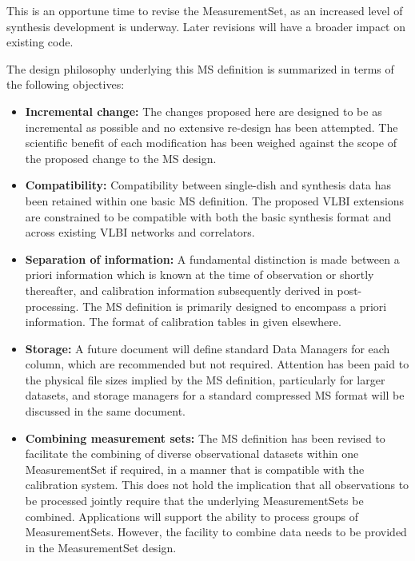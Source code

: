 \documentclass{article}
\begin{document}
This is an opportune time to revise the MeasurementSet, as an
increased level of synthesis development is underway. Later revisions
will have a broader impact on existing code.

The design philosophy underlying this MS definition is summarized in
terms of the following objectives:

\begin{itemize}

\item{{\bf Incremental change:} The changes proposed here are designed
to be as incremental as possible and no extensive re-design has been
attempted. The scientific benefit of each modification has been weighed
against the scope of the proposed change to the MS design.}

\item{{\bf Compatibility:} Compatibility between single-dish and
synthesis data has been retained within one basic MS definition. The
proposed VLBI extensions are constrained to be compatible with both
the basic synthesis format and across existing VLBI networks and
correlators.}

\item{{\bf Separation of information:} A fundamental distinction is
made between a priori information which is known at the time of
observation or shortly thereafter, and calibration information
subsequently derived in post-processing. The MS definition is
primarily designed to encompass a priori information. The format of
calibration tables in given elsewhere.}

\item{{\bf Storage:} A future document will define standard Data
Managers for each column, which are recommended but not
required. Attention has been paid to the physical file sizes implied
by the MS definition, particularly for larger datasets, and storage
managers for a standard compressed MS format will be discussed in the
same document.}

\item{{\bf Combining measurement sets:} The MS definition has been
revised to facilitate the combining of diverse observational datasets
within one MeasurementSet if required, in a manner that is compatible
with the calibration system. This does not hold the implication that
all observations to be processed jointly require that the underlying
MeasurementSets be combined. Applications will support the ability to
process groups of MeasurementSets. However, the facility to combine
data needs to be provided in the MeasurementSet design.

}
\end{itemize}
\end{document}
